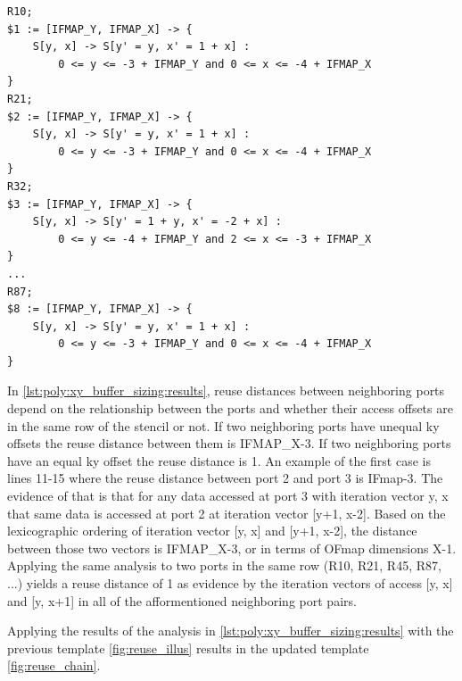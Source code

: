 \clearpage 

\begin{lstlisting}[caption=Polyhedral analysis of reuse in iscc for convolution loops, label={lst:poly:xy_buffer_sizing:results}]
R10;
$1 := [IFMAP_Y, IFMAP_X] -> { 
    S[y, x] -> S[y' = y, x' = 1 + x] : 
        0 <= y <= -3 + IFMAP_Y and 0 <= x <= -4 + IFMAP_X 
}
R21;
$2 := [IFMAP_Y, IFMAP_X] -> { 
    S[y, x] -> S[y' = y, x' = 1 + x] : 
        0 <= y <= -3 + IFMAP_Y and 0 <= x <= -4 + IFMAP_X 
}
R32;
$3 := [IFMAP_Y, IFMAP_X] -> { 
    S[y, x] -> S[y' = 1 + y, x' = -2 + x] : 
        0 <= y <= -4 + IFMAP_Y and 2 <= x <= -3 + IFMAP_X 
}
...
R87;
$8 := [IFMAP_Y, IFMAP_X] -> { 
    S[y, x] -> S[y' = y, x' = 1 + x] : 
        0 <= y <= -3 + IFMAP_Y and 0 <= x <= -4 + IFMAP_X 
}
\end{lstlisting}

In \ref{lst:poly:xy_buffer_sizing:results}, reuse distances between neighboring
ports depend on the relationship between the ports and whether their access offsets
are in the same row of the stencil or not. If two neighboring ports have unequal
ky offsets the reuse distance between them is IFMAP\_X-3. If two neighboring
ports have an equal ky offset the reuse distance is 1. An example of the first
case is lines 11-15 where the reuse distance between port 2 and port 3 is
IFmap-3. The evidence of that is that for any data accessed at port 3 with
iteration vector y, x that same data is accessed at port 2 at iteration vector
[y+1, x-2]. Based on the lexicographic ordering of iteration vector [y, x] and [y+1,
x-2], the distance between those two vectors is IFMAP\_X-3, or in terms of OFmap
dimensions X-1. Applying the same analysis to two ports in the same row (R10,
R21, R45, R87, ...) yields a reuse distance of 1 as evidence by the iteration
vectors of access [y, x] and [y, x+1] in all of the afformentioned neighboring
port pairs. 

Applying the results of the analysis in
\autoref{lst:poly:xy_buffer_sizing:results} with the previous template \autoref{fig:reuse_illus}
results in the updated template \autoref{fig:reuse_chain}.

